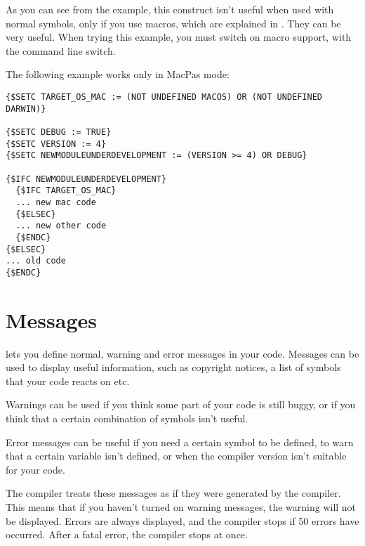 As you can see from the example, this construct isn't useful when used
with normal symbols, only if you use macros, which are explained in
. They can be very useful. When trying this example, you must
switch on macro support, with the  command line switch.

The following example works only in MacPas mode:
\begin{verbatim}
{$SETC TARGET_OS_MAC := (NOT UNDEFINED MACOS) OR (NOT UNDEFINED DARWIN)}

{$SETC DEBUG := TRUE}
{$SETC VERSION := 4}
{$SETC NEWMODULEUNDERDEVELOPMENT := (VERSION >= 4) OR DEBUG}

{$IFC NEWMODULEUNDERDEVELOPMENT}
  {$IFC TARGET_OS_MAC}
  ... new mac code
  {$ELSEC}
  ... new other code
  {$ENDC}
{$ELSEC}
... old code
{$ENDC}
\end{verbatim}

\section{Messages}
\label{se:Messages}
\fpc lets you define normal, warning and error messages in your code.
Messages can be used to display useful information, such as copyright
notices, a list of symbols that your code reacts on etc.

Warnings can be used if you think some part of your code is still buggy, or
if you think that a certain combination of symbols isn't useful.

Error messages can be useful if you need a certain symbol to be defined,
to warn that a certain variable isn't defined, or when the compiler
version isn't suitable for your code.

The compiler treats these messages as if they were generated by the
compiler. This means that if you haven't turned on warning messages, the
warning will not be displayed. Errors are always displayed, and the
compiler stops if 50 errors have occurred. After a fatal error, the compiler
stops at once.

